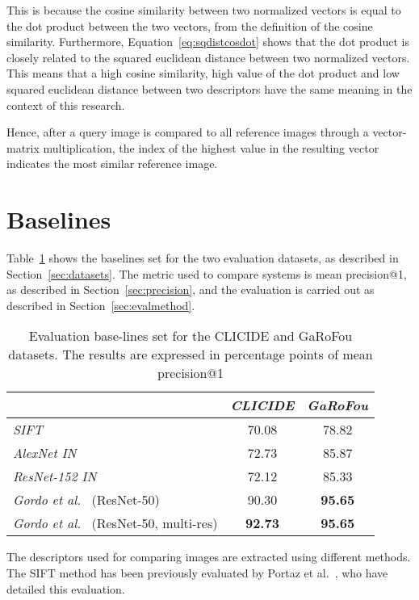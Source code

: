 This is because the cosine similarity between two normalized vectors is
equal to the dot product between the two vectors, from the definition
of the cosine similarity. Furthermore, Equation~\ref{eq:sqdistcosdot} shows
that the dot product is closely related to the squared
euclidean distance between two normalized vectors.
This means that a high cosine similarity, high value of the dot product
and low squared euclidean distance between two descriptors have the
same meaning in the context of this research.

Hence, after a query image is compared to all reference images through
a vector-matrix multiplication, the index of the highest value in the
resulting vector indicates the most similar reference image.

\section{Baselines}\label{sec:baselines}
Table~\ref{tab:baselines} shows the baselines set for the two evaluation
datasets, as described in Section~\ref{sec:datasets}. The metric used
to compare systems is mean precision@1, as described in
Section~\ref{sec:precision}, and the evaluation is carried out as
described in Section~\ref{sec:evalmethod}.

\begin{table}
\begin{tabular}{|l|c|c|}
\hline & \emph{CLICIDE} & \emph{GaRoFou}\\
\hline \emph{SIFT} & 70.08 & 78.82\\
\hline \emph{AlexNet IN} & 72.73 & 85.87\\
\hline \emph{ResNet-152 IN} & 72.12 & 85.33\\
\hline \emph{Gordo et al.}~\cite{gordo_deep_2016} (ResNet-50) & 90.30 & \textbf{95.65}\\
\hline \emph{Gordo et al.}~\cite{gordo_deep_2016} (ResNet-50, multi-res)
& \textbf{92.73} & \textbf{95.65}\\
\hline
\end{tabular}
\caption{Evaluation base-lines set for the CLICIDE and GaRoFou datasets.
The results are expressed in percentage points of
mean precision@1\label{tab:baselines}}
\end{table}

The descriptors used for comparing images are extracted using different
methods.
The SIFT method has been previously evaluated by
Portaz et al.~\cite{portaz_construction_2017}, who have detailed this
evaluation.

